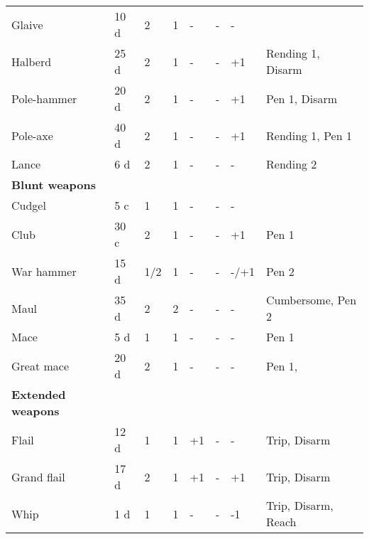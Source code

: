 \documentclass[a4paper,11pt,oneside]{book}
\newcommand{\textlf}[1]{\textbf{\titlecap{#1}}}
\begin{document}
\begin{table}[ht!]
\begin{tabular}{|l|l|l|l|l|l|l|l|}
		Glaive & 10 d & 2 & 1 & - & - & - & \textlf{damage edge+} \\
		Halberd & 25 d & 2 & 1 & - & - & +1 & Rending 1, Disarm\\
		Pole-hammer & 20 d & 2 & 1 & - & - & +1 & Pen 1, Disarm\\ 
		Pole-axe & 40 d & 2 & 1 & - & - & +1 & Rending 1, Pen 1 \\
		Lance & 6 d & 2 & 1 & - & - & - & Rending 2\\
		\hline
		\textbf{Blunt weapons} & & & & & & & \\
		\hline
		Cudgel & 5 c & 1  & 1 & - & - & - &  \\
		Club & 30 c & 2 & 1 & - & - & +1 & Pen 1 \\
		War hammer & 15 d & 1/2 & 1 & - & - & -/+1 & Pen 2 \\ 
		Maul & 35 d & 2 & 2 & - & - & - & Cumbersome, Pen 2 \\
		Mace & 5 d & 1 & 1 & - & - & - & Pen 1 \\
		Great mace & 20 d & 2 & 1 & - & - & - & Pen 1, \textlf{damage edge+}\\
		\hline
		\textbf{Extended weapons} & & & & & & & \\
		\hline
		Flail & 12 d & 1 & 1 & +1 & - & - & Trip, Disarm \\ 
		Grand flail & 17 d & 2 & 1 & +1 & - & +1 & Trip, Disarm\\
		Whip & 1 d & 1 & 1 & - & - & -1 & Trip, Disarm, Reach\\
		\hline
	\end{tabular}
\end{table}
\end{document}
